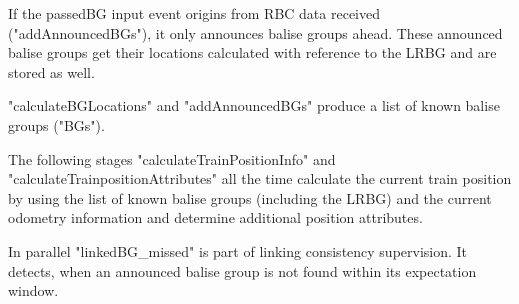 If the passedBG input event origins from RBC data received ("addAnnouncedBGs"), it only announces balise groups ahead. These announced balise groups get their locations calculated with reference to the LRBG and are stored as well.

"calculateBGLocations" and "addAnnouncedBGs" produce a list of known balise groups ("BGs"). 

The following stages "calculateTrainPositionInfo" and "calculateTrainpositionAttributes" all the time calculate the current train position by using the list of known balise groups (including the LRBG) and the current odometry information and determine additional position attributes.

In parallel "linkedBG\_missed" is part of linking consistency supervision. It detects, when an announced balise group is not found within its expectation window. 

